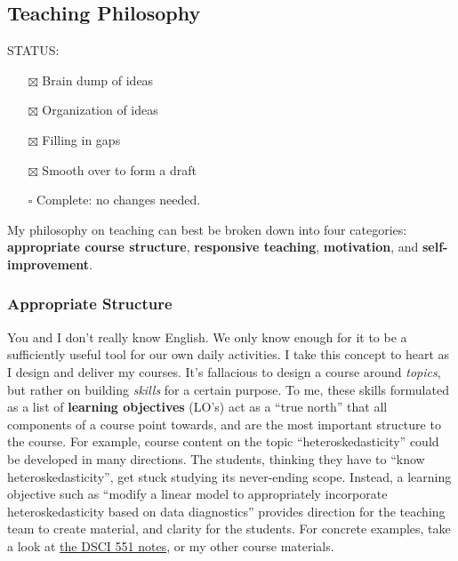 \documentclass[]{article}
\providecommand{\tightlist}{%
  \setlength{\itemsep}{0pt}\setlength{\parskip}{0pt}}
\begin{document}
\hypertarget{teaching-philosophy}{%
\subsection{Teaching Philosophy}\label{teaching-philosophy}}

STATUS:

\begin{itemize}
\tightlist
\item[$\boxtimes$]
  Brain dump of ideas
\item[$\boxtimes$]
  Organization of ideas
\item[$\boxtimes$]
  Filling in gaps
\item[$\boxtimes$]
  Smooth over to form a draft
\item[$\square$]
  Complete: no changes needed.
\end{itemize}

My philosophy on teaching can best be broken down into four categories: \textbf{appropriate course structure}, \textbf{responsive teaching}, \textbf{motivation}, and \textbf{self-improvement}.

\hypertarget{appropriate-structure}{%
\subsubsection{Appropriate Structure}\label{appropriate-structure}}

You and I don't really know English. We only know enough for it to be a sufficiently useful tool for our own daily activities. I take this concept to heart as I design and deliver my courses. It's fallacious to design a course around \emph{topics}, but rather on building \emph{skills} for a certain purpose. To me, these skills formulated as a list of \textbf{learning objectives} (LO's) act as a ``true north'' that all components of a course point towards, and are the most important structure to the course. For example, course content on the topic ``heteroskedasticity'' could be developed in many directions. The students, thinking they have to ``know heteroskedasticity'', get stuck studying its never-ending scope. Instead, a learning objective such as ``modify a linear model to appropriately incorporate heteroskedasticity based on data diagnostics'' provides direction for the teaching team to create material, and clarity for the students. For concrete examples, take a look at \href{https://ubc-mds.github.io/DSCI_551_stat-prob-dsci/lectures/}{the DSCI 551 notes}, or my other course materials.
\end{document}
